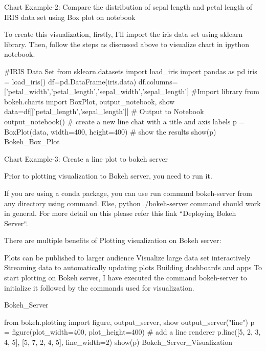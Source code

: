 
Chart Example-2: Compare the distribution of sepal length and petal length of IRIS data set using 
Box plot on notebook

To create this visualization, firstly, I’ll import the iris data set using sklearn library. Then, 
follow the steps as discussed above to visualize chart in ipython notebook.

#IRIS Data Set
from sklearn.datasets import load_iris
import pandas as pd
iris = load_iris()
df=pd.DataFrame(iris.data)
df.columns=['petal_width','petal_length','sepal_width','sepal_length']
#Import library
from bokeh.charts import BoxPlot, output_notebook, show
data=df[['petal_length','sepal_length']]
# Output to Notebook
output_notebook()
# create a new line chat with a title and axis labels
p = BoxPlot(data, width=400, height=400)
# show the results
show(p)
Bokeh_Box_Plot

 

Chart Example-3: Create a line plot to bokeh server

Prior to plotting visualization to Bokeh server, you need to run it.

If you are using a conda package, you can use run command bokeh-server from any directory 
using command. Else, python ./bokeh-server command should work in general. For more detail on this 
please refer this link “Deploying Bokeh Server“.

There are multiple benefits of Plotting visualization on Bokeh server:

Plots can be published to larger audience
Visualize large data set interactively
Streaming data to automatically updating plots
Building dashboards and apps
To start plotting on Bokeh server, I have executed the command bokeh-server to initialize it followed by 
the commands used for visualization.

Bokeh_Server

from bokeh.plotting import figure, output_server, show
output_server("line")
p = figure(plot_width=400, plot_height=400)
# add a line renderer
p.line([5, 2, 3, 4, 5], [5, 7, 2, 4, 5], line_width=2)
show(p)
Bokeh_Server_Visualization
